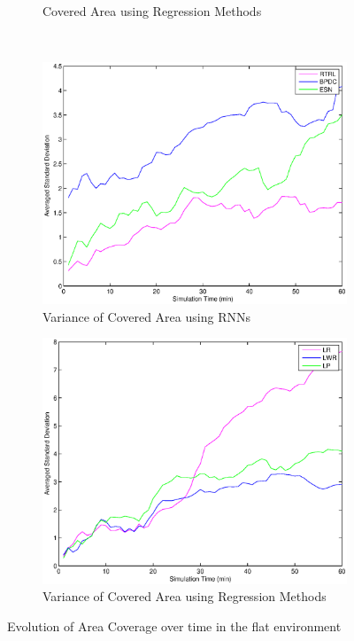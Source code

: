 \documentclass[msc,ai,logo]{infthesis}
\begin{document}
\begin{figure}[H]
\begin{subfigure}[b]{0.49\textwidth}
                \caption{Covered Area using Regression Methods}
               \label{fig:LR_00_AREA}  
        \end{subfigure}
        ~ %
        \begin{subfigure}[b]{0.49\textwidth}
                \centering
                \includegraphics[width=\textwidth]{RNN_00_AREAvar.eps}
                \caption{Variance of Covered Area using RNNs \\} 
                \label{RNN_00_AREAvar}
        \end{subfigure}
\begin{subfigure}[b]{0.49\textwidth}
                \centering
                \includegraphics[width=\textwidth]{LR_00_AREAvar.eps}
                \caption{Variance of Covered Area using Regression Methods}
         \label{LR_00_AREAvar}        
        \end{subfigure}
        \caption{Evolution of Area Coverage over time in the flat environment}
\end{figure}
\end{document}
